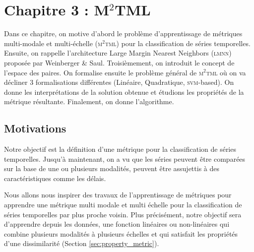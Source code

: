 \chapter*{Chapitre 3 : M$^2$TML}

Dans ce chapitre, on motive d'abord le problème d'apprentissage de métriques multi-modale et multi-échelle (\textsc{m$^2$tml}) pour la classification de séries temporelles. Ensuite, on rappelle l'architecture Large Margin Nearest Neighbors (\textsc{lmnn}) proposée par Weinberger \& Saul. Troisièmement, on introduit le concept de l'espace des paires. On formalise ensuite le problème général de \textsc{m$^2$tml} où on va décliner 3 formalisations différentes (Linéaire, Quadratique, \textsc{svm}-based). On donne les interprétations de la solution obtenue et étudions les propriétés de la métrique résultante. Finalement, on donne l'algorithme.

\section*{Motivations}
Notre objectif est la définition d'une métrique pour la classification de séries temporelles. Jusqu'à maintenant, on a vu que les séries peuvent être comparées sur la base de une ou plusieurs modalités, peuvent être assujettis à des caractéristiques comme les délais. 

Nous allons nous inspirer des travaux de l'apprentissage de métriques pour apprendre une métrique multi modale et multi échelle pour la classification de séries temporelles par plus proche voisin. Plus précisément, notre objectif sera d'apprendre depuis les données, une fonction linéaires ou non-linéaires qui combine plusieurs modalités à plusieurs échelles et qui satisfait les propriétés d'une dissimilarité (Section \ref{sec:property_metric}).

